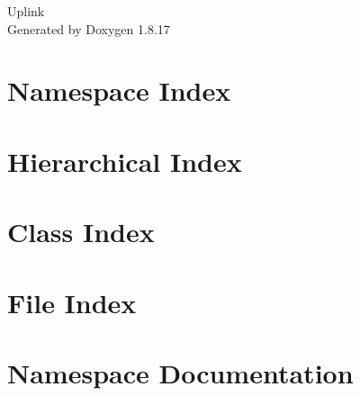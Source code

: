 \let\mypdfximage\pdfximage\def\pdfximage{\immediate\mypdfximage}\documentclass[twoside]{book}
\newcommand{\+}{\discretionary{\mbox{\scriptsize$\hookleftarrow$}}{}{}}
\newcommand{\clearemptydoublepage}{%
  \newpage{\pagestyle{empty}\cleardoublepage}%
}
\begin{document}
\hypersetup{pageanchor=false,
             bookmarksnumbered=true,
             pdfencoding=unicode
            }
\begin{titlepage}
\vspace*{7cm}
\begin{center}%
{\Large Uplink }\\
\vspace*{1cm}
{\large Generated by Doxygen 1.8.17}\\
\end{center}
\end{titlepage}
\clearemptydoublepage
{}
\tableofcontents
\clearemptydoublepage
{}
\hypersetup{pageanchor=true}

\chapter{Namespace Index}

\chapter{Hierarchical Index}

\chapter{Class Index}

\chapter{File Index}

\chapter{Namespace Documentation}

\end{document}
